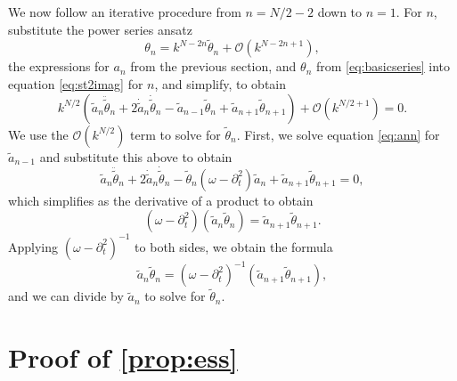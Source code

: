 \documentclass[11pt,reqno]{amsart}
\begin{document}
We now follow an iterative procedure from $n=N/2-2$ down to $n=1$. For $n$, substitute the power series ansatz
\[
\theta_{n} = k^{N-2n} \widetilde{\theta}_{n} + \mathcal{O}(k^{N-2n+1}),
\]
the expressions for $a_n$ from the previous section, and $\theta_n$ from \cref{eq:basicseries} into equation \cref{eq:st2imag} for $n$, and simplify, to obtain
\[
k^{N/2} \left( \widetilde{a}_n \ddot{\widetilde{\theta}}_n + 2 \dot{\widetilde{a}}_n \dot{\widetilde{\theta}}_n
- \widetilde{a}_{n-1} \widetilde{\theta}_n + \widetilde{a}_{n+1}\widetilde{\theta}_{n+1} \right) + \mathcal{O}\left(k^{N/2+1}\right) = 0.
\]
We use the $\mathcal{O}(k^{N/2})$ term to solve for $\widetilde{\theta}_{n}$. First, we solve equation \cref{eq:ann} for $\widetilde{a}_{n-1}$ and substitute this above to obtain
\[
\widetilde{a}_n \ddot{\widetilde{\theta}}_n + 2 \dot{\widetilde{a}}_n \dot{\widetilde{\theta}}_n
- \widetilde{\theta}_n (\omega - \partial_t^2) \widetilde{a}_n + \widetilde{a}_{n+1} \widetilde{\theta}_{n+1} = 0,
\]
which simplifies as the derivative of a product to obtain
\[
(\omega - \partial_t^2)\left( \widetilde{a}_n \widetilde{\theta}_n \right) = \widetilde{a}_{n+1} \widetilde{\theta}_{n+1}.
\]
Applying $(\omega - \partial_t^2)^{-1}$ to both sides, we obtain the formula
\begin{equation}\label{an2th}
\widetilde{a}_n \widetilde{\theta}_n = (\omega - \partial_t^2)^{-1} \left( \widetilde{a}_{n+1} \widetilde{\theta}_{n+1} \right),
\end{equation}
and we can divide by $\widetilde{a}_n$ to solve for $\widetilde{\theta}_n$. 

\section{Proof of \texorpdfstring{\cref{prop:ess}}{Proposition 1}}\label{app:prop1proof}
\end{document}
